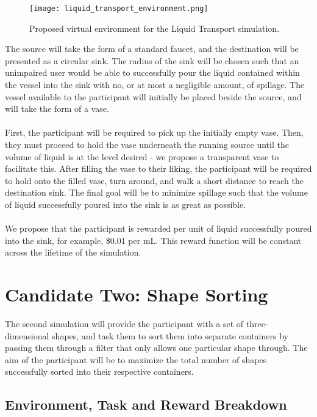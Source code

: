 \documentclass{article}
\begin{document}
\begin{figure}[H]
    \texttt{[image: liquid\_transport\_environment.png]}
    \centering
    \caption{Proposed virtual environment for the Liquid Transport simulation.}
\end{figure}

The source will take the form of a standard faucet, and the destination will be presented as a circular sink. The radius of the sink will be chosen such that an unimpaired user would be able to successfully pour the liquid contained within the vessel into the sink with no, or at most a negligible amount, of spillage. The vessel available to the participant will initially be placed beside the source, and will take the form of a vase.
\\
\\
First, the participant will be required to pick up the initially empty vase. Then, they must proceed to hold the vase underneath the running source until the volume of liquid is at the level desired - we propose a transparent vase to facilitate this. After filling the vase to their liking, the participant will be required to hold onto the filled vase, turn around, and walk a short distance to reach the destination sink. The final goal will be to minimize spillage such that the volume of liquid successfully poured into the sink is as great as possible.
\\
\\
We propose that the participant is rewarded per unit of liquid successfully poured into the sink, for example, \$0.01 per mL. This reward function will be constant across the lifetime of the simulation.

\section*{Candidate Two: Shape Sorting}

The second simulation will provide the participant with a set of three-dimensional shapes, and task them to sort them into separate containers by passing them through a filter that only allows one particular shape through. The aim of the participant will be to maximize the total number of shapes successfully sorted into their respective containers.

\subsection*{Environment, Task and Reward Breakdown}
\end{document}
